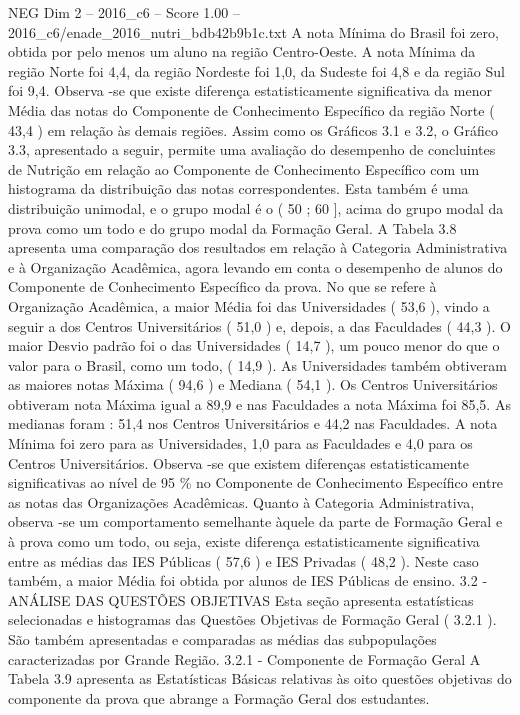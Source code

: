 \begin{textsample}{NEG Dim 2 – 2016\_c6 – Score 1.00 – 2016\_c6/enade\_2016\_nutri\_bdb42b9b1c.txt}
A nota Mínima do Brasil foi zero, obtida por pelo menos um aluno na região Centro-Oeste.
A nota Mínima da região Norte foi 4,4, da região Nordeste foi 1,0, da Sudeste foi 4,8 e da região Sul foi 9,4.
Observa -se que existe diferença estatisticamente significativa da menor Média das notas do Componente de Conhecimento Específico da região Norte ( 43,4 ) em relação às demais regiões.
Assim como os Gráficos 3.1 e 3.2, o Gráfico 3.3, apresentado a seguir, permite uma avaliação do desempenho de concluintes de Nutrição em relação ao Componente de Conhecimento Específico com um histograma da distribuição das notas correspondentes.
Esta também é uma distribuição unimodal, e o grupo modal é o ( 50 ; 60 ], acima do grupo modal da prova como um todo e do grupo modal da Formação Geral.
A Tabela 3.8 apresenta uma comparação dos resultados em relação à Categoria Administrativa e à Organização Acadêmica, agora levando em conta o desempenho de alunos do Componente de Conhecimento Específico da prova.
No que se refere à Organização Acadêmica, a maior Média foi das Universidades ( 53,6 ), vindo a seguir a dos Centros Universitários ( 51,0 ) e, depois, a das Faculdades ( 44,3 ).
O maior Desvio padrão foi o das Universidades ( 14,7 ), um pouco menor do que o valor para o Brasil, como um todo, ( 14,9 ).
As Universidades também obtiveram as maiores notas Máxima ( 94,6 ) e Mediana ( 54,1 ).
Os Centros Universitários obtiveram nota Máxima igual a 89,9 e nas Faculdades a nota Máxima foi 85,5.
As medianas foram : 51,4 nos Centros Universitários e 44,2 nas Faculdades.
A nota Mínima foi zero para as Universidades, 1,0 para as Faculdades e 4,0 para os Centros Universitários.
Observa -se que existem diferenças estatisticamente significativas ao nível de 95 \% no Componente de Conhecimento Específico entre as notas das Organizações Acadêmicas.
Quanto à Categoria Administrativa, observa -se um comportamento semelhante àquele da parte de Formação Geral e à prova como um todo, ou seja, existe diferença estatisticamente significativa entre as médias das IES Públicas ( 57,6 ) e IES Privadas ( 48,2 ).
Neste caso também, a maior Média foi obtida por alunos de IES Públicas de ensino. 3.2 - ANÁLISE DAS QUESTÕES OBJETIVAS Esta seção apresenta estatísticas selecionadas e histogramas das Questões Objetivas de Formação Geral ( 3.2.1 ).
São também apresentadas e comparadas as médias das subpopulações caracterizadas por Grande Região. 3.2.1 - Componente de Formação Geral A Tabela 3.9 apresenta as Estatísticas Básicas relativas às oito questões objetivas do componente da prova que abrange a Formação Geral dos estudantes.

\end{textsample}
